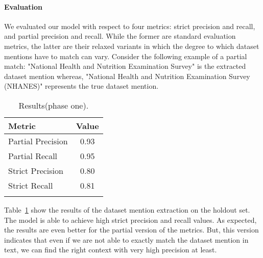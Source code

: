 \paragraph{Evaluation}
We evaluated our model with respect to four metrics: strict precision and recall, and partial precision and recall. While the former are standard evaluation metrics, the latter are their relaxed variants in which the degree to which dataset mentions have to match can vary. 
Consider the following example of a partial match: "National Health and Nutrition Examination Survey" is the extracted dataset mention whereas, "National Health and Nutrition Examination Survey (NHANES)" represents the true dataset mention. 
\begin{table}[b]
    \center 
    \caption{Results(phase one). } 
    \begin{tabular}{lc} 
        \toprule
        Metric  & Value \\
        \midrule
        Partial Precision   & 0.93 \\
        Partial Recall      & 0.95 \\
        \midrule
        Strict Precision    & 0.80 \\
        Strict Recall       & 0.81 \\ 
        \bottomrule \\ 
    \end{tabular} 
    \label{table:dataset-mention-eval} 
\end{table}

Table~\ref{table:dataset-mention-eval} show the results of the dataset mention extraction on the holdout set. The model is able to achieve high strict precision and recall values. As expected, the results are even better for the partial version of the metrics. But, this version indicates that even if we are not able to exactly match the dataset mention in text, we can find the right context with very high precision at least.

